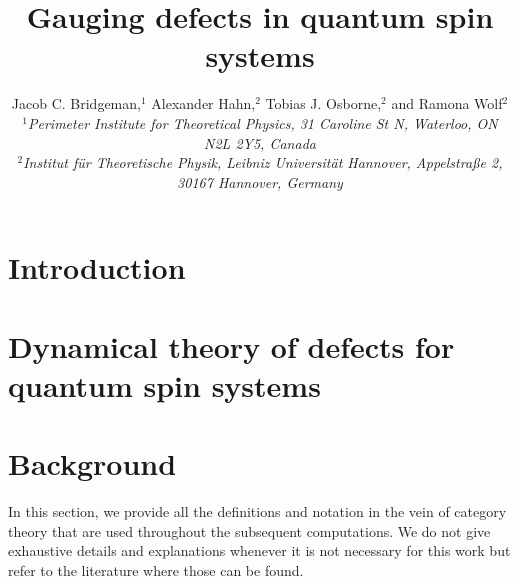 




\title{Gauging defects in quantum spin systems}

\author{
	Jacob C. Bridgeman,$^1$ Alexander Hahn,$^2$ Tobias J. Osborne,$^2$ and Ramona Wolf$^2$\\
	$^{1}$\it{Perimeter Institute for Theoretical Physics, 31 Caroline St N, Waterloo, ON N2L 2Y5, Canada}\\
	$^{2}$\it{Institut für Theoretische Physik, Leibniz Universität Hannover, Appelstraße 2, 30167 Hannover, Germany}
}
                            

\begin{abstract}

\end{abstract}

\maketitle

\section{Introduction}


\section{Dynamical theory of defects for quantum spin systems}



\section{Background}\label{S:defs}
In this section, we provide all the definitions and notation in the vein of category theory that are used throughout the subsequent computations. We do not give exhaustive details and explanations whenever it is not necessary for this work but refer to the literature where those can be found.

